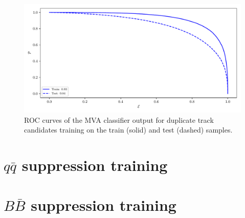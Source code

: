 \documentclass[headings=standardclasses,headings=big,oneside,a4paper,openany,12pt]{scrbook}
\begin{document}
\begin{figure}[H]
\centering
\captionsetup{width=0.8\linewidth}
\includegraphics[width=\linewidth]{fig/addendums/curl_roc}
\caption{ROC curves of the MVA classifier output for duplicate track candidates training on the train (solid) and test (dashed) samples.}
\end{figure}

\section*{$q \bar q$ suppression training}

\section*{$B \bar B$ suppression training}
\end{document}
